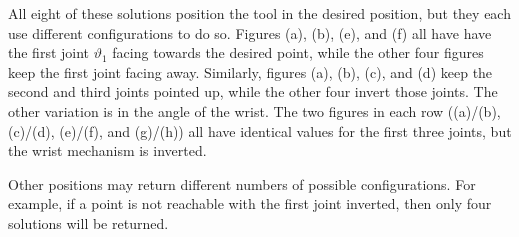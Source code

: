 \documentclass[conference]{IEEEtran}
\begin{document}
All eight of these solutions position the tool in the desired position, but they each use different configurations to do so. Figures (a), (b), (e), and (f) all have have the first joint $\vartheta_1$ facing towards the desired point, while the other four figures keep the first joint facing away. Similarly, figures (a), (b), (c), and (d) keep the second and third joints pointed up, while the other four invert those joints. The other variation is in the angle of the wrist. The two figures in each row ((a)/(b), (c)/(d), (e)/(f), and (g)/(h)) all have identical values for the first three joints, but the wrist mechanism is inverted. 

Other positions may return different numbers of possible configurations. For example, if a point is not reachable with the first joint inverted, then only four solutions will be returned.
\end{document}
